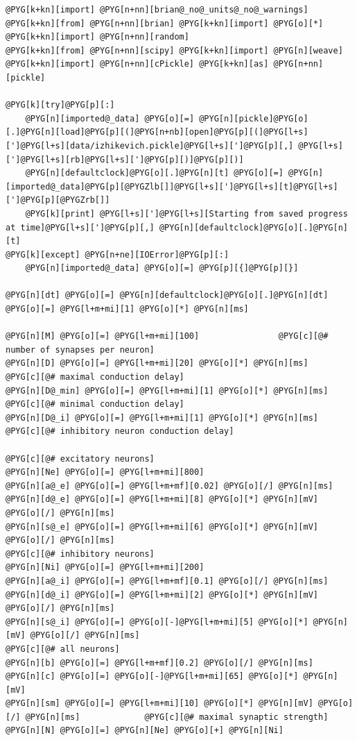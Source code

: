 \documentclass[letterpaper,10pt,english]{manual}
\begin{document}
\begin{Verbatim}[commandchars=@\[\]]
@PYG[k+kn][import] @PYG[n+nn][brian@_no@_units@_no@_warnings]
@PYG[k+kn][from] @PYG[n+nn][brian] @PYG[k+kn][import] @PYG[o][*]
@PYG[k+kn][import] @PYG[n+nn][random]
@PYG[k+kn][from] @PYG[n+nn][scipy] @PYG[k+kn][import] @PYG[n][weave]
@PYG[k+kn][import] @PYG[n+nn][cPickle] @PYG[k+kn][as] @PYG[n+nn][pickle]

@PYG[k][try]@PYG[p][:]
    @PYG[n][imported@_data] @PYG[o][=] @PYG[n][pickle]@PYG[o][.]@PYG[n][load]@PYG[p][(]@PYG[n+nb][open]@PYG[p][(]@PYG[l+s][']@PYG[l+s][data/izhikevich.pickle]@PYG[l+s][']@PYG[p][,] @PYG[l+s][']@PYG[l+s][rb]@PYG[l+s][']@PYG[p][)]@PYG[p][)]
    @PYG[n][defaultclock]@PYG[o][.]@PYG[n][t] @PYG[o][=] @PYG[n][imported@_data]@PYG[p][@PYGZlb[]]@PYG[l+s][']@PYG[l+s][t]@PYG[l+s][']@PYG[p][@PYGZrb[]]
    @PYG[k][print] @PYG[l+s][']@PYG[l+s][Starting from saved progress at time]@PYG[l+s][']@PYG[p][,] @PYG[n][defaultclock]@PYG[o][.]@PYG[n][t]
@PYG[k][except] @PYG[n+ne][IOError]@PYG[p][:]
    @PYG[n][imported@_data] @PYG[o][=] @PYG[p][{]@PYG[p][}]

@PYG[n][dt] @PYG[o][=] @PYG[n][defaultclock]@PYG[o][.]@PYG[n][dt] @PYG[o][=] @PYG[l+m+mi][1] @PYG[o][*] @PYG[n][ms]

@PYG[n][M] @PYG[o][=] @PYG[l+m+mi][100]                @PYG[c][@# number of synapses per neuron]
@PYG[n][D] @PYG[o][=] @PYG[l+m+mi][20] @PYG[o][*] @PYG[n][ms]              @PYG[c][@# maximal conduction delay]
@PYG[n][D@_min] @PYG[o][=] @PYG[l+m+mi][1] @PYG[o][*] @PYG[n][ms]           @PYG[c][@# minimal conduction delay]
@PYG[n][D@_i] @PYG[o][=] @PYG[l+m+mi][1] @PYG[o][*] @PYG[n][ms]             @PYG[c][@# inhibitory neuron conduction delay]

@PYG[c][@# excitatory neurons]
@PYG[n][Ne] @PYG[o][=] @PYG[l+m+mi][800]
@PYG[n][a@_e] @PYG[o][=] @PYG[l+m+mf][0.02] @PYG[o][/] @PYG[n][ms]
@PYG[n][d@_e] @PYG[o][=] @PYG[l+m+mi][8] @PYG[o][*] @PYG[n][mV] @PYG[o][/] @PYG[n][ms]
@PYG[n][s@_e] @PYG[o][=] @PYG[l+m+mi][6] @PYG[o][*] @PYG[n][mV] @PYG[o][/] @PYG[n][ms]
@PYG[c][@# inhibitory neurons]
@PYG[n][Ni] @PYG[o][=] @PYG[l+m+mi][200]
@PYG[n][a@_i] @PYG[o][=] @PYG[l+m+mf][0.1] @PYG[o][/] @PYG[n][ms]
@PYG[n][d@_i] @PYG[o][=] @PYG[l+m+mi][2] @PYG[o][*] @PYG[n][mV] @PYG[o][/] @PYG[n][ms]
@PYG[n][s@_i] @PYG[o][=] @PYG[o][-]@PYG[l+m+mi][5] @PYG[o][*] @PYG[n][mV] @PYG[o][/] @PYG[n][ms]
@PYG[c][@# all neurons]
@PYG[n][b] @PYG[o][=] @PYG[l+m+mf][0.2] @PYG[o][/] @PYG[n][ms]
@PYG[n][c] @PYG[o][=] @PYG[o][-]@PYG[l+m+mi][65] @PYG[o][*] @PYG[n][mV]
@PYG[n][sm] @PYG[o][=] @PYG[l+m+mi][10] @PYG[o][*] @PYG[n][mV] @PYG[o][/] @PYG[n][ms]             @PYG[c][@# maximal synaptic strength]
@PYG[n][N] @PYG[o][=] @PYG[n][Ne] @PYG[o][+] @PYG[n][Ni]


\end{Verbatim}
\end{document}
